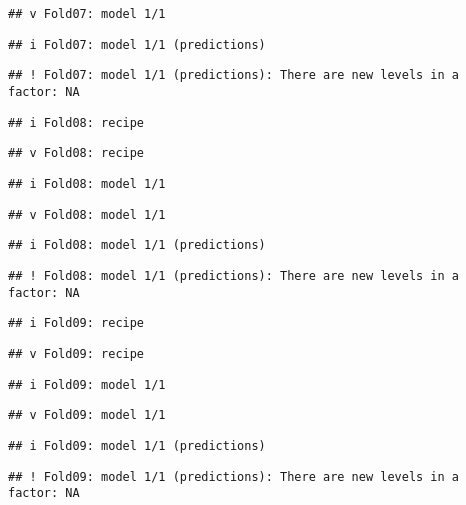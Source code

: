 \documentclass[
]{article}
\begin{document}
\begin{verbatim}
## v Fold07: model 1/1
\end{verbatim}

\begin{verbatim}
## i Fold07: model 1/1 (predictions)
\end{verbatim}

\begin{verbatim}
## ! Fold07: model 1/1 (predictions): There are new levels in a factor: NA
\end{verbatim}

\begin{verbatim}
## i Fold08: recipe
\end{verbatim}

\begin{verbatim}
## v Fold08: recipe
\end{verbatim}

\begin{verbatim}
## i Fold08: model 1/1
\end{verbatim}

\begin{verbatim}
## v Fold08: model 1/1
\end{verbatim}

\begin{verbatim}
## i Fold08: model 1/1 (predictions)
\end{verbatim}

\begin{verbatim}
## ! Fold08: model 1/1 (predictions): There are new levels in a factor: NA
\end{verbatim}

\begin{verbatim}
## i Fold09: recipe
\end{verbatim}

\begin{verbatim}
## v Fold09: recipe
\end{verbatim}

\begin{verbatim}
## i Fold09: model 1/1
\end{verbatim}

\begin{verbatim}
## v Fold09: model 1/1
\end{verbatim}

\begin{verbatim}
## i Fold09: model 1/1 (predictions)
\end{verbatim}

\begin{verbatim}
## ! Fold09: model 1/1 (predictions): There are new levels in a factor: NA
\end{verbatim}
\end{document}

